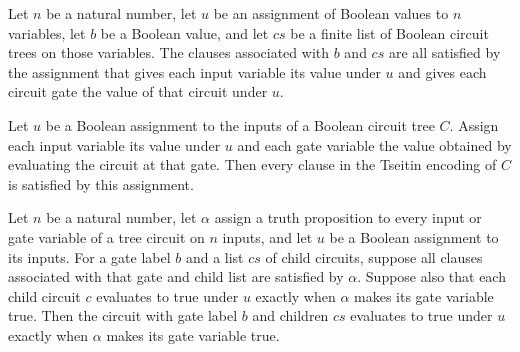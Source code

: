 \begin{theorem}
\label{BoolCircuit.gateClauses_satisfied}
\leanok
{}
Let $n$ be a natural number, let $u$ be an assignment of Boolean values to $n$
variables, let $b$ be a Boolean value, and let $cs$ be a finite list of Boolean circuit
trees on those variables. The clauses associated with $b$ and $cs$ are all satisfied by
the assignment that gives each input variable its value under $u$ and gives each circuit
gate the value of that circuit under $u$.
\end{theorem}

\begin{theorem}
\label{BoolCircuit.tseitin_satisfied}
\leanok
{}
Let $u$ be a Boolean assignment to the inputs of a Boolean circuit tree $C$. Assign each
input variable its value under $u$ and each gate variable the value obtained by
evaluating the circuit at that gate. Then every clause in the Tseitin encoding of $C$ is
satisfied by this assignment.
\end{theorem}

\begin{theorem}
\label{BoolCircuit.eval_node_iff_of_gateClauses}
\leanok
{}
Let $n$ be a natural number, let $\alpha$ assign a truth proposition to every input or
gate variable of a tree circuit on $n$ inputs, and let $u$ be a Boolean assignment to
its inputs. For a gate label $b$ and a list $cs$ of child circuits, suppose all clauses
associated with that gate and child list are satisfied by $\alpha$. Suppose also that
each child circuit $c$ evaluates to true under $u$ exactly when $\alpha$ makes its gate
variable true. Then the circuit with gate label $b$ and children $cs$ evaluates to true
under $u$ exactly when $\alpha$ makes its gate variable true.
\end{theorem}

